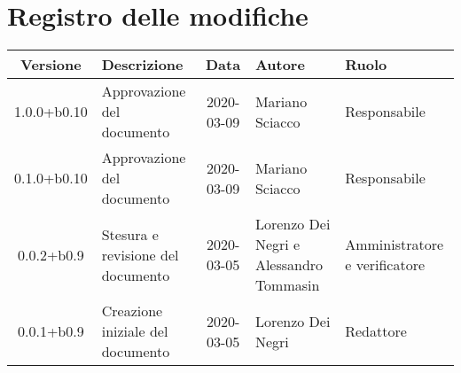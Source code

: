 \section*{Registro delle modifiche}

\begin{center}
	\begin{longtable}{|c|p{3.5cm}|c|p{3cm}|p{3cm}|}
	\hline
	\rowcolor{lighter-grayer}
	\textbf{Versione} & \textbf{Descrizione} & \textbf{Data} & \textbf{Autore} & \textbf{Ruolo} \\
	\hline
	\endfirsthead


	1.0.0+b0.10 & Approvazione del documento & 2020-03-09 & Mariano Sciacco & Responsabile \\
	\hline
	0.1.0+b0.10 & Approvazione del documento & 2020-03-09 & Mariano Sciacco & Responsabile \\
	\hline
	0.0.2+b0.9 & Stesura e revisione del documento & 2020-03-05 & Lorenzo Dei Negri e Alessandro Tommasin & Amministratore e verificatore \\
	\hline
	0.0.1+b0.9 & Creazione iniziale del documento & 2020-03-05 & Lorenzo Dei Negri & Redattore \\
	\hline

	\end{longtable}
\end{center}